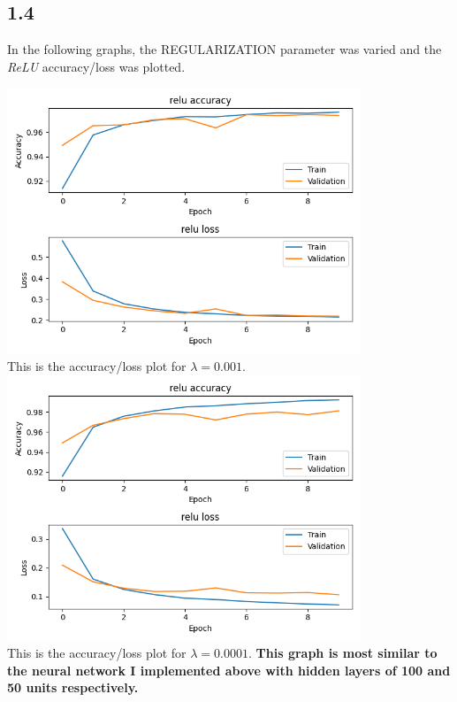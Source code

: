 \documentclass[a4paper,14pt]{extarticle}
\begin{document}
\subsection*{1.4}
In the following graphs, the REGULARIZATION parameter was varied and the \textit{ReLU} accuracy/loss was plotted.
\begin{center}
\includegraphics[width=400]{Figure_1_lambda_001.png}\\
This is the accuracy/loss plot for $\lambda = 0.001$.
\includegraphics[width=400]{Figure_1_lambda_0001.png}\\
This is the accuracy/loss plot for $\lambda = 0.0001$. \textbf{This graph is most similar to the neural network I implemented above with hidden layers of 100 and 50 units respectively.}

\end{center}
\end{document}
